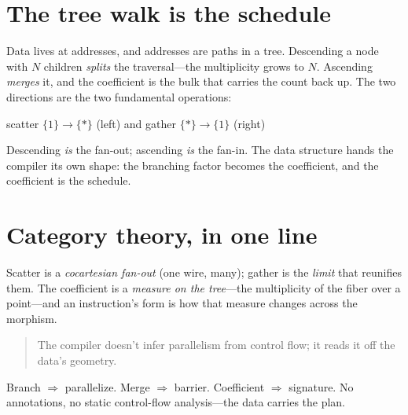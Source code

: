 \documentclass[11pt]{article}
\begin{document}
\section{The tree walk is the schedule}

Data lives at addresses, and addresses are paths in a tree. Descending a node
with $N$ children \emph{splits} the traversal---the multiplicity grows to $N$.
Ascending \emph{merges} it, and the coefficient is the bulk that carries the
count back up. The two directions are the two fundamental operations:

\begin{center}
\qquad
{}

\small scatter $\{1\} \to \{*\}$ (left) and gather $\{*\} \to \{1\}$ (right)
\end{center}

Descending \emph{is} the fan-out; ascending \emph{is} the fan-in. The data
structure hands the compiler its own shape: the branching factor becomes the
coefficient, and the coefficient is the schedule.

\section{Category theory, in one line}

Scatter is a \emph{cocartesian fan-out} (one wire, many); gather is the
\emph{limit} that reunifies them. The coefficient is a \emph{measure on the
tree}---the multiplicity of the fiber over a point---and an instruction's form
is how that measure changes across the morphism.

\begin{quote}
The compiler doesn't infer parallelism from control flow; it reads it off the
data's geometry.
\end{quote}

Branch $\Rightarrow$ parallelize. Merge $\Rightarrow$ barrier. Coefficient
$\Rightarrow$ signature. No annotations, no static control-flow analysis---the
data carries the plan.
\end{document}
